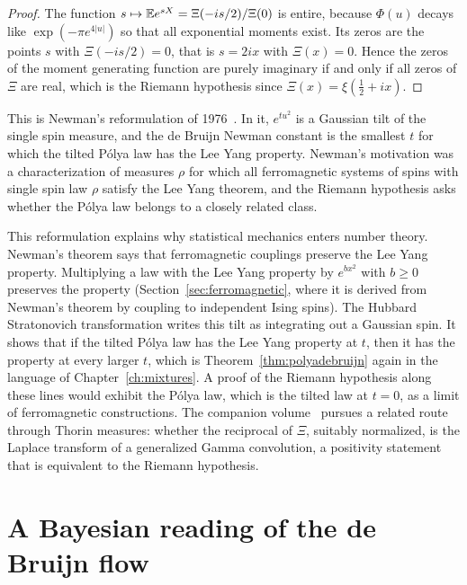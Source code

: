 \begin{proof}
The function $s\mapsto\mathbb{E} e^{sX} = \Xi(-is/2)/\Xi(0)$ is entire, because $\Phi(u)$ decays like $\exp(-\pi e^{4|u|})$ so that all exponential moments exist. Its zeros are the points $s$ with $\Xi(-is/2) = 0$, that is $s = 2ix$ with $\Xi(x) = 0$. Hence the zeros of the moment generating function are purely imaginary if and only if all zeros of $\Xi$ are real, which is the Riemann hypothesis since $\Xi(x) = \xi(\frac12+ix)$.
\end{proof} This is Newman's reformulation of 1976~\cite{newman1976}. In it, $e^{tu^2}$ is a Gaussian tilt of the single spin measure, and the de Bruijn Newman constant is the smallest $t$ for which the tilted P\'olya law has the Lee Yang property. Newman's motivation was a characterization of measures $\rho$ for which all ferromagnetic systems of spins with single spin law $\rho$ satisfy the Lee Yang theorem, and the Riemann hypothesis asks whether the P\'olya law belongs to a closely related class.

This reformulation explains why statistical mechanics enters number theory. Newman's theorem says that ferromagnetic couplings preserve the Lee Yang property. Multiplying a law with the Lee Yang property by $e^{bx^2}$ with $b\geq0$ preserves the property (Section~\ref{sec:ferromagnetic}, where it is derived from Newman's theorem by coupling to independent Ising spins). The Hubbard Stratonovich transformation writes this tilt as integrating out a Gaussian spin. It shows that if the tilted P\'olya law has the Lee Yang property at $t$, then it has the property at every larger $t$, which is Theorem~\ref{thm:polyadebruijn} again in the language of Chapter~\ref{ch:mixtures}. A proof of the Riemann hypothesis along these lines would exhibit the P\'olya law, which is the tilted law at $t = 0$, as a limit of ferromagnetic constructions. The companion volume~\cite{polsonh8} pursues a related route through Thorin measures: whether the reciprocal of $\Xi$, suitably normalized, is the Laplace transform of a generalized Gamma convolution, a positivity statement that is equivalent to the Riemann hypothesis.

\section{A Bayesian reading of the de Bruijn flow}

